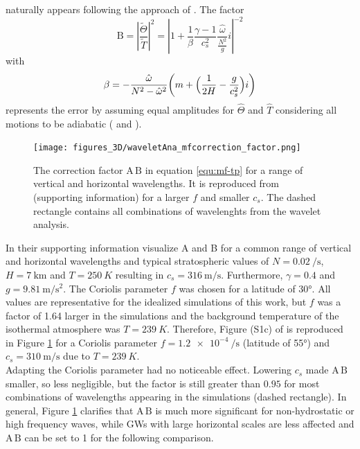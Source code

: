 naturally appears following the approach of \textcite[]{ern_absolute_2004}. The factor
\begin{equation}
    \textrm{B} = \left| \frac{\tilde{\Theta}}{\tilde{T}} \right|^2 = \left| 1 + \frac{1}{\beta} \frac{\gamma-1}{c_s^2} \frac{\hat{\omega}}{\frac{N^2}{g}}i\right|^{-2}
    \label{equ:B}
\end{equation}
with
\begin{equation}
    \beta = -\frac{\hat{\omega}}{N^2-\hat{\omega}^2} \biggl(m + \Bigl(\frac{1}{2H}-\frac{g}{c_s^2}\Bigr)i\biggr)
    \label{equ:beta}
\end{equation}
represents the error by assuming equal amplitudes for $\hat{\Theta}$ and $\hat{T}$ considering all motions to be adiabatic (\cite[]{fritts_gravity_2003} and \cite[]{ern_directional_2017}).
\begin{figure}
    \texttt{[image: figures\_3D/waveletAna\_mfcorrection\_factor.png]}
    \caption{The correction factor $\textrm{A} \, \textrm{B}$ in equation \ref{equ:mf-tp} for a range of vertical and horizontal wavelengths. It is reproduced from \textcite[]{ern_directional_2017} (supporting information) for a larger $f$ and smaller $c_s$. The dashed rectangle contains all combinations of wavelenghts from the wavelet analysis.}
    \label{fig:mf_correction}
\end{figure}
In their supporting information \textcite[]{ern_directional_2017} visualize A and B for a common range of vertical and horizontal wavelengths and typical stratospheric values of $N=\SI{0.02}{\per\second}$, $H=\SI{7}{\kilo\meter}$ and $T=\SI{250}{K}$ resulting in $c_s = \SI{316}{\meter\per\second}$. Furthermore, $\gamma=0.4$ and $g=\SI{9.81}{\meter\per\second^2}$. The Coriolis parameter $f$ was chosen for a latitude of 30°. All values are representative for the idealized simulations of this work, but $f$ was a factor of 1.64 larger in the simulations and the background temperature of the isothermal atmosphere was $T=\SI{239}{K}$. Therefore, Figure (S1c) of \textcite[]{ern_directional_2017} is reproduced in Figure \ref{fig:mf_correction} for a Coriolis parameter $f=\SI{1.2e-4}{\per\second}$ (latitude of 55°) and $c_s = \SI{310}{\meter\per\second}$ due to $T=\SI{239}{K}$. \\
Adapting the Coriolis parameter had no noticeable effect. Lowering $c_s$ made $\textrm{A} \, \textrm{B}$ smaller, so less negligible, but the factor is still greater than $0.95$ for most combinations of wavelengths appearing in the simulations (dashed rectangle). In general, Figure \ref{fig:mf_correction} clarifies that $\textrm{A} \, \textrm{B}$ is much more significant for non-hydrostatic or high frequency waves, while GWs with large horizontal scales are less affected and $\textrm{A} \, \textrm{B}$ can be set to 1 for the following comparison.

